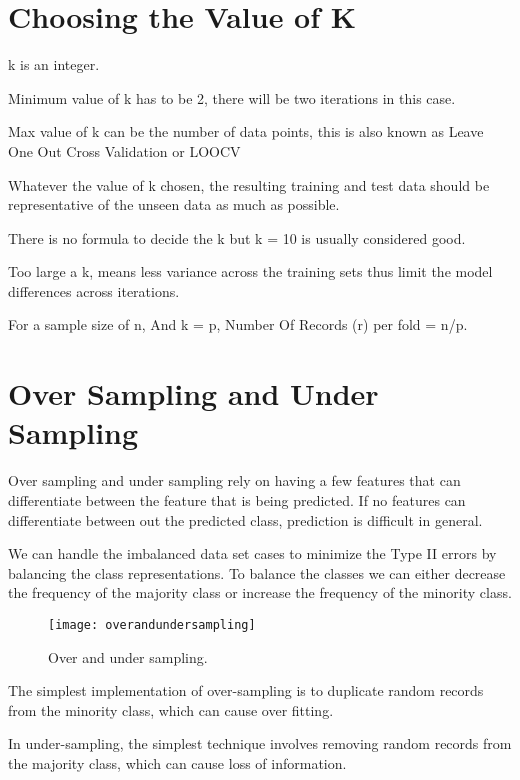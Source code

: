 	\section{Choosing the Value of K}
	\begin{bulletedlist}
		\item k is an integer.
		\item Minimum value of k has to be 2, there will be two iterations in this case.
		\item Max value of k can be the number of data points, this is also known as Leave One Out Cross Validation or LOOCV
		\item Whatever the value of k chosen, the resulting training and test data should be representative of the unseen data as much as possible.
		\item There is no formula to decide the k but k = 10 is usually considered good.
		\item Too large a k, means less variance across the training sets thus limit the model differences across iterations.
		\item For a sample size of n, And k = p, Number Of Records (r) per fold = n/p.
	\end{bulletedlist}


	\section{Over Sampling and Under Sampling}
Over sampling and under sampling rely on having a few features that can differentiate between the feature that is being predicted.  If no features can differentiate between out the predicted class, prediction is difficult in general.

We can handle the imbalanced data set cases to minimize the Type II errors by balancing the class representations.  To balance the classes we can either decrease the frequency of the majority class or increase the frequency of the minority class.
	\begin{figure}[h]
		\centering
		\texttt{[image: overandundersampling]}
		\caption{Over and under sampling.}
		\label{fig:overandundersampling}
	\end{figure}

The simplest implementation of over-sampling is to duplicate random records from the minority class, which can cause over fitting.

In under-sampling, the simplest technique involves removing random records from the majority class, which can cause loss of information.

